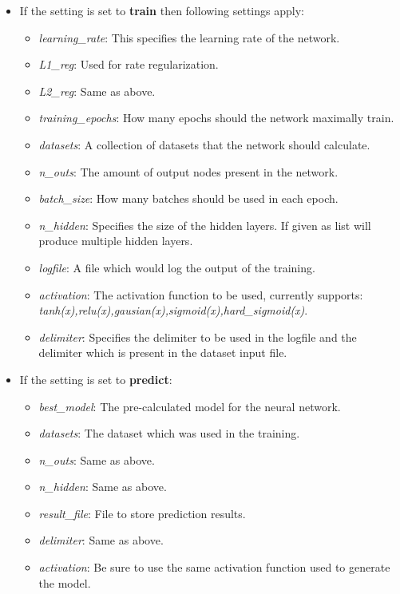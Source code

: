 \documentclass[12pt]{article}
\begin{document}
\begin{itemize}
    \item If the setting is set to \textbf{train} then following settings apply:
        \begin{itemize}
            \item \emph{learning\_rate}: This specifies the learning rate of the network.
            \item \emph{L1\_reg}: Used for rate regularization. 
            \item \emph{L2\_reg}: Same as above.
            \item \emph{training\_epochs}: How many epochs should the network maximally train.
            \item \emph{datasets}: A collection of datasets that the network should calculate.
            \item \emph{n\_outs}: The amount of output nodes present in the network.
            \item \emph{batch\_size}: How many batches should be used in each epoch.
            \item \emph{n\_hidden}: Specifies the size of the hidden layers. If given as list will produce multiple hidden layers.
            \item \emph{logfile}: A file which would log the output of the training.
            \item \emph{activation}: The activation function to be used, currently supports: \textit{tanh(x),relu(x),gausian(x),sigmoid(x),hard\_sigmoid(x)}.
            \item \emph{delimiter}: Specifies the delimiter to be used in the logfile and the delimiter which is present in the dataset input file.
        \end{itemize}
    \item If the setting is set to \textbf{predict}:
        \begin{itemize}
            \item \emph{best\_model}: The pre-calculated model for the neural network.
            \item \emph{datasets}: The dataset which was used in the training.
            \item \emph{n\_outs}: Same as above.
            \item \emph{n\_hidden}: Same as above.
            \item \emph{result\_file}: File to store prediction results.
            \item \emph{delimiter}: Same as above.
            \item \emph{activation}: Be sure to use the same activation function used to generate the model.
        \end{itemize}
\end{itemize}
\end{document}

